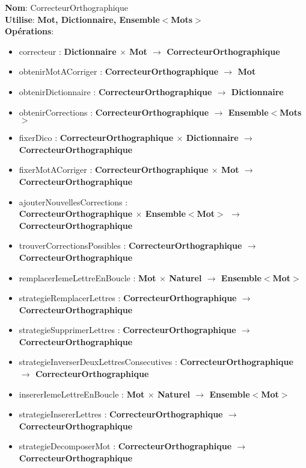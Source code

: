 
    \textbf{Nom}: CorrecteurOrthographique \\
    \textbf{Utilise}: \textbf{Mot, Dictionnaire, Ensemble$<$Mots$>$} \\
    \textbf{Opérations}: \begin{itemize}[label=$\ $, leftmargin=2cm, itemsep=0cm]
        \item correcteur : \textbf{Dictionnaire $\times$ Mot $\rightarrow$ CorrecteurOrthographique}
        \item obtenirMotACorriger : \textbf{CorrecteurOrthographique $\rightarrow$ Mot}
        \item obtenirDictionnaire : \textbf{CorrecteurOrthographique $\rightarrow$ Dictionnaire}
        \item obtenirCorrections : \textbf{CorrecteurOrthographique $\rightarrow$ Ensemble$<$Mots$>$}
        \item fixerDico : \textbf{CorrecteurOrthographique $\times$ Dictionnaire $\rightarrow$ CorrecteurOrthographique}
        \item fixerMotACorriger : \textbf{CorrecteurOrthographique $\times$ Mot $\rightarrow$ CorrecteurOrthographique}
        \item ajouterNouvellesCorrections : \\ \textbf{CorrecteurOrthographique $\times$ Ensemble$<$Mot$>$ $\rightarrow$ CorrecteurOrthographique}
        \item trouverCorrectionsPossibles : \textbf{CorrecteurOrthographique $\rightarrow$ CorrecteurOrthographique}
        \item remplacerIemeLettreEnBoucle : \textbf{Mot $\times$ Naturel $\rightarrow$ Ensemble$<$Mot$>$}
        \item strategieRemplacerLettres : \textbf{CorrecteurOrthographique $\rightarrow$ CorrecteurOrthographique}
        \item strategieSupprimerLettres : \textbf{CorrecteurOrthographique $\rightarrow$ CorrecteurOrthographique}
        \item strategieInverserDeuxLettresConsecutives : \textbf{CorrecteurOrthographique $\rightarrow$ CorrecteurOrthographique}
        \item insererIemeLettreEnBoucle : \textbf{Mot $\times$ Naturel $\rightarrow$ Ensemble$<$Mot$>$}
        \item strategieInsererLettres : \textbf{CorrecteurOrthographique $\rightarrow$ CorrecteurOrthographique}
        \item strategieDecomposerMot : \textbf{CorrecteurOrthographique $\rightarrow$ CorrecteurOrthographique}
    \end{itemize}
